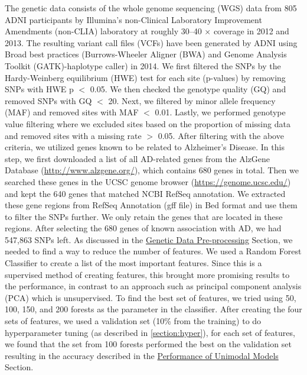The genetic data consists of the whole genome sequencing (WGS) data from 805 ADNI participants by Illumina’s non-Clinical Laboratory Improvement Amendments (non-CLIA) laboratory at roughly 30–40 × coverage in 2012 and 2013. The resulting variant call files (VCFs) have been generated by ADNI using Broad best practices (Burrows-Wheeler Aligner (BWA) and Genome Analysis Toolkit (GATK)-haplotype caller) in 2014. We first filtered the SNPs by the Hardy-Weinberg equilibrium (HWE) test for each site (p-values) by removing SNPs with HWE p $<$ 0.05. We then checked the genotype quality (GQ) and removed SNPs with GQ $<$ 20. Next, we filtered by minor allele frequency (MAF) and removed sites with MAF $<$ 0.01. Lastly, we performed genotype value filtering where we excluded sites based on the proportion of missing data and removed sites with a missing rate $>$ 0.05. After filtering with the above criteria, we utilized genes known to be related to Alzheimer’s Disease. In this step, we first downloaded a list of all AD-related genes from the AlzGene Database (\url{http://www.alzgene.org/}), which contains 680 genes in total. Then we searched these genes in the UCSC genome browser (\url{https://genome.ucsc.edu/}) and kept the 640 genes that matched NCBI RefSeq annotation. We extracted these gene regions from RefSeq Annotation (gff file) in Bed format and use them to filter the SNPs further. We only retain the genes that are located in these regions. After selecting the 680 genes of known association with AD, we had 547,863 SNPs left. As discussed in the {\hyperref[subsubsection:genetic_proc]{Genetic Data Pre-processing} Section}, we needed to find a way to reduce the number of features. We used a Random Forest Classifier to create a list of the most important features. Since this is a supervised method of creating features, this brought more promising results to the performance, in contrast to an approach such as principal component analysis (PCA) which is unsupervised. To find the best set of features, we tried using 50, 100, 150, and 200 forests as the parameter in the classifier. After creating the four sets of features, we used a validation set (10\% from the training) to do hyperparameter tuning (as described in \ref{section:hyper}), for each set of features, we found that the set from 100 forests performed the best on the validation set resulting in the accuracy described in {the \hyperref[subsection:uni_frame]{Performance of Unimodal Models} Section}. 

